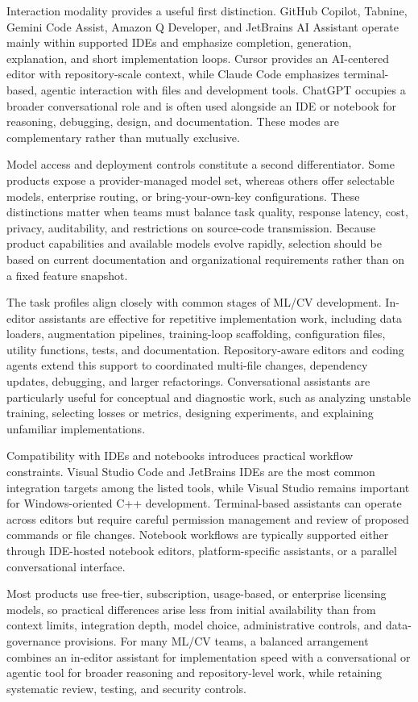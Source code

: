 \documentclass{article}
\begin{document}
Interaction modality provides a useful first distinction. GitHub Copilot, Tabnine, Gemini Code Assist, Amazon Q Developer, and JetBrains AI Assistant operate mainly within supported IDEs and emphasize completion, generation, explanation, and short implementation loops. Cursor provides an AI-centered editor with repository-scale context, while Claude Code emphasizes terminal-based, agentic interaction with files and development tools. ChatGPT occupies a broader conversational role and is often used alongside an IDE or notebook for reasoning, debugging, design, and documentation. These modes are complementary rather than mutually exclusive.

Model access and deployment controls constitute a second differentiator. Some products expose a provider-managed model set, whereas others offer selectable models, enterprise routing, or bring-your-own-key configurations. These distinctions matter when teams must balance task quality, response latency, cost, privacy, auditability, and restrictions on source-code transmission. Because product capabilities and available models evolve rapidly, selection should be based on current documentation and organizational requirements rather than on a fixed feature snapshot.

The task profiles align closely with common stages of ML/CV development. In-editor assistants are effective for repetitive implementation work, including data loaders, augmentation pipelines, training-loop scaffolding, configuration files, utility functions, tests, and documentation. Repository-aware editors and coding agents extend this support to coordinated multi-file changes, dependency updates, debugging, and larger refactorings. Conversational assistants are particularly useful for conceptual and diagnostic work, such as analyzing unstable training, selecting losses or metrics, designing experiments, and explaining unfamiliar implementations.

Compatibility with IDEs and notebooks introduces practical workflow constraints. Visual Studio Code and JetBrains IDEs are the most common integration targets among the listed tools, while Visual Studio remains important for Windows-oriented C++ development. Terminal-based assistants can operate across editors but require careful permission management and review of proposed commands or file changes. Notebook workflows are typically supported either through IDE-hosted notebook editors, platform-specific assistants, or a parallel conversational interface.

Most products use free-tier, subscription, usage-based, or enterprise licensing models, so practical differences arise less from initial availability than from context limits, integration depth, model choice, administrative controls, and data-governance provisions. For many ML/CV teams, a balanced arrangement combines an in-editor assistant for implementation speed with a conversational or agentic tool for broader reasoning and repository-level work, while retaining systematic review, testing, and security controls.
\end{document}
